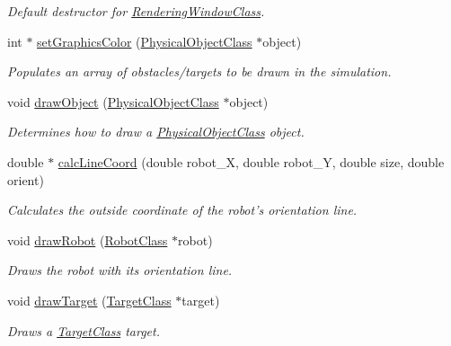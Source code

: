 \begin{DoxyCompactItemize}
\begin{DoxyCompactList}\small\item\em Default destructor for \hyperlink{classRenderingWindowClass}{Rendering\-Window\-Class}. \end{DoxyCompactList}\item 
int $\ast$ \hyperlink{classRenderingWindowClass_a57edbe70d96c699103a4f4e2d34736d5}{set\-Graphics\-Color} (\hyperlink{classPhysicalObjectClass}{Physical\-Object\-Class} $\ast$object)
\begin{DoxyCompactList}\small\item\em Populates an array of obstacles/targets to be drawn in the simulation. \end{DoxyCompactList}\item 
void \hyperlink{classRenderingWindowClass_a633f976d7c799676075d3f8025c00006}{draw\-Object} (\hyperlink{classPhysicalObjectClass}{Physical\-Object\-Class} $\ast$object)
\begin{DoxyCompactList}\small\item\em Determines how to draw a \hyperlink{classPhysicalObjectClass}{Physical\-Object\-Class} object. \end{DoxyCompactList}\item 
double $\ast$ \hyperlink{classRenderingWindowClass_af2f7cb3cba6db0f30515d6b66025ca2a}{calc\-Line\-Coord} (double robot\-\_\-\-X, double robot\-\_\-\-Y, double size, double orient)
\begin{DoxyCompactList}\small\item\em Calculates the outside coordinate of the robot's orientation line. \end{DoxyCompactList}\item 
void \hyperlink{classRenderingWindowClass_a1df618c6a1ceddc801b30d6cd15171e9}{draw\-Robot} (\hyperlink{classRobotClass}{Robot\-Class} $\ast$robot)
\begin{DoxyCompactList}\small\item\em Draws the robot with its orientation line. \end{DoxyCompactList}\item 
void \hyperlink{classRenderingWindowClass_a27fe156f6e76032ee94dff6278e76aa8}{draw\-Target} (\hyperlink{classTargetClass}{Target\-Class} $\ast$target)
\begin{DoxyCompactList}\small\item\em Draws a \hyperlink{classTargetClass}{Target\-Class} target. \end{DoxyCompactList}\item 

\end{DoxyCompactItemize}
